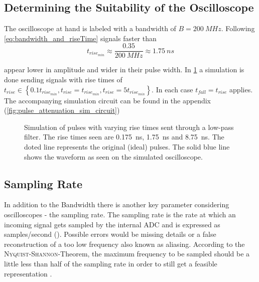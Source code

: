     \subsection{Determining the Suitability of the Oscilloscope}\label{sec:A5_oscopes_suitability}%
        The oscilloscope at hand is labeled with a bandwidth of \( B = \SI{200}{MHz} \). Following \cref{eq:bandwidth_and_riseTime}
        signals faster than
        \begin{equation}
            t_{rise_{min}} \approx \frac{0.35}{\SI{200}{MHz}} \approx \SI{1.75}{ns}
        \end{equation}\par
        appear lower in amplitude and wider in their pulse width. In \cref{fig:low-pass-simulation} a simulation is done
        sending signals with rise times of \( t_{rise} \in \left\lbrace 0.1t_{rise_{min}}, t_{rise} = t_{rise_{min}}, t_{rise} = 5t_{rise_{min}} \right\rbrace \).
        In each case \( t_{fall} = t_{rise} \) applies. The accompanying simulation circuit can be found in the appendix
        (\cref{fig:pulse_attenuation_sim_circuit})\par
        \begin{figure}[h]
            \centering
            
            \caption[Simulation of pulses with varying rise times]{Simulation of pulses with varying rise times sent through a low-pass filter. The rise times seen are \SI{0.175}{ns}, \SI{1.75}{ns} and \SI{8.75}{ns}.
            The doted line represents the original (ideal) pulses. The solid blue line shows the waveform as seen on the simulated oscilloscope.}
            \label{fig:low-pass-simulation}
        \end{figure}
    \subsection{Sampling Rate}\label{sec:A6:sampling_rate}%
    In addition to the Bandwidth there is another key parameter considering oscilloscopes - the sampling rate. The sampling rate
    is the rate at which an incoming signal gets sampled by the internal ADC and is expressed as samples/second (\SI{}{}). Possible
    errors would be missing details or a false reconstruction of a too low frequency also known as aliasing.
    According to the \textsc{Nyquist-Shannon}-Theorem, the maximum frequency to be sampled should be a little less than
    half of the sampling rate in order to still get a feasible representation \cite{Eichler.2016}. 
